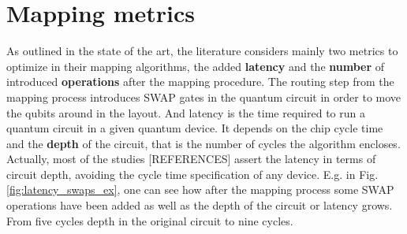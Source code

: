 \section*{Mapping metrics}
\label{sec:orgb17066e}

As outlined in the state of the art, the literature considers mainly two metrics to optimize in their mapping algorithms, the added \textbf{latency} and the \textbf{number} of introduced \textbf{operations} after the mapping procedure.
The routing step from the mapping process introduces SWAP gates in the quantum circuit in order to move the qubits around in the layout.
And latency is the time required to run a quantum circuit in a given quantum device.
It depends on the chip cycle time and the \textbf{depth} of the circuit, that is the number of cycles the algorithm encloses.
Actually, most of the studies [REFERENCES] assert the latency in terms of circuit depth, avoiding the cycle time specification of any device.
E.g. in Fig. \ref{fig:latency_swaps_ex}, one can see how after the mapping process some SWAP operations have been added as well as the depth of the circuit or latency grows.
From five cycles depth in the original circuit to nine cycles.


